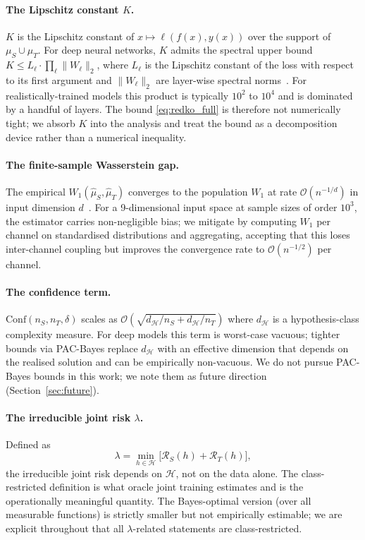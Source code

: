 \documentclass{article}
\begin{document}
\paragraph{The Lipschitz constant $K$.} $K$ is the Lipschitz constant
of $x \mapsto \ell(f(x), y(x))$ over the support of $\mu_S \cup \mu_T$.
For deep neural networks, $K$ admits the spectral upper bound
$K \le L_\ell \cdot \prod_\ell \|W_\ell\|_2$, where $L_\ell$ is the
Lipschitz constant of the loss with respect to its first argument and
$\|W_\ell\|_2$ are layer-wise spectral norms~\citep{bartlett2017spectrally}.
For realistically-trained models this product is typically $10^2$ to
$10^4$ and is dominated by a handful of layers. The bound
\eqref{eq:redko_full} is therefore not numerically tight; we absorb $K$
into the analysis and treat the bound as a decomposition device rather
than a numerical inequality.

\paragraph{The finite-sample Wasserstein gap.} The empirical
$W_1(\hat\mu_S, \hat\mu_T)$ converges to the population $W_1$ at rate
$\mathcal{O}(n^{-1/d})$ in input dimension $d$~\citep{fournier2015rate}.
For a 9-dimensional input space at sample sizes of order $10^3$, the
estimator carries non-negligible bias; we mitigate by computing $W_1$
per channel on standardised distributions and aggregating, accepting
that this loses inter-channel coupling but improves the convergence
rate to $\mathcal{O}(n^{-1/2})$ per channel.

\paragraph{The confidence term.} $\mathrm{Conf}(n_S, n_T, \delta)$ scales
as $\mathcal{O}(\sqrt{d_\mathcal{H}/n_S + d_\mathcal{H}/n_T})$ where
$d_\mathcal{H}$ is a hypothesis-class complexity measure. For
deep models this term is worst-case vacuous; tighter bounds via
PAC-Bayes \citep{germain2013pac,dziugaite2017computing} replace
$d_\mathcal{H}$ with an effective dimension that depends on the
realised solution and can be empirically non-vacuous. We do not pursue
PAC-Bayes bounds in this work; we note them as future direction
(Section~\ref{sec:future}).

\paragraph{The irreducible joint risk $\lambda$.} Defined as
\begin{equation}
\lambda = \min_{h \in \mathcal{H}}
\big[\mathcal{R}_S(h) + \mathcal{R}_T(h)\big],
\label{eq:lambda_def}
\end{equation}
the irreducible joint risk depends on $\mathcal{H}$, not on the data
alone. The class-restricted definition is what oracle joint training
estimates and is the operationally meaningful quantity. The
Bayes-optimal version (over all measurable functions) is strictly
smaller but not empirically estimable; we are explicit throughout that
all $\lambda$-related statements are class-restricted.
\end{document}
